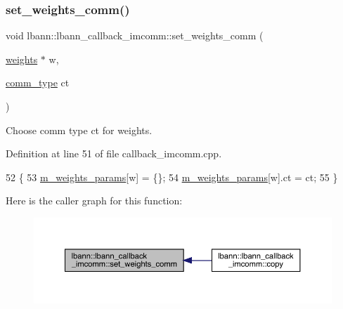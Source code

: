\subsubsection{\texorpdfstring{set\+\_\+weights\+\_\+comm()}{set\_weights\_comm()}}
{\footnotesize\ttfamily void lbann\+::lbann\+\_\+callback\+\_\+imcomm\+::set\+\_\+weights\+\_\+comm (\begin{DoxyParamCaption}\item[{\hyperlink{classlbann_1_1weights}{weights} $\ast$}]{w,  }\item[{\hyperlink{classlbann_1_1lbann__callback__imcomm_acf7e894b3381e7f9b71020dc73594d6a}{comm\+\_\+type}}]{ct }\end{DoxyParamCaption})}

Choose comm type ct for weights. 

Definition at line 51 of file callback\+\_\+imcomm.\+cpp.


\begin{DoxyCode}
52                                                            \{
53   \hyperlink{classlbann_1_1lbann__callback__imcomm_a32a0319c91aff324cb3468de4f31dd50}{m\_weights\_params}[w] = \{\};
54   \hyperlink{classlbann_1_1lbann__callback__imcomm_a32a0319c91aff324cb3468de4f31dd50}{m\_weights\_params}[w].ct = ct;
55 \}
\end{DoxyCode}
Here is the caller graph for this function\+:\nopagebreak
\begin{figure}[H]
\begin{center}
\leavevmode
\includegraphics[width=350pt]{classlbann_1_1lbann__callback__imcomm_a6ad492f30a34de2ac62fe459037e1d12_icgraph}
\end{center}
\end{figure}
\mbox{\label{classlbann_1_1lbann__callback__imcomm_acf71333f73d26714217ffcd93aa31830}} 
